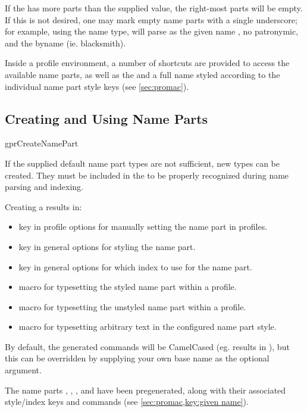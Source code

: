 \documentclass[
	a4paper,
]{article}
\begin{document}
If the  has more parts than the supplied value, the right-most parts will be empty. If this is not desired, one may mark empty name parts with a single underscore; for example, using the  name type,  will parse as the given name , no patronymic, and the byname  (ie. blacksmith).

Inside a profile environment, a number of shortcuts are provided to access the available name parts, as well as the  and a full name styled according to the individual name part style keys (see \cref{sec:promac}).

\subsection{Creating and Using Name Parts} %

\begin{docCommand}
	{gprCreateNamePart}
	{}

	If the supplied default name part types are not sufficient, new types can be created. They must be included in the  to be properly recognized during name parsing and indexing.

	Creating a  results in:
	\begin{itemize}
	\item {} key in profile options for manually setting the name part in profiles.
	\item {} key in general options for styling the name part.
	\item {} key in general options for which index to use for the name part.
	\item {} macro for typesetting the styled name part within a profile.
	\item {} macro for typesetting the unstyled name part within a profile.
	\item {} macro for typesetting arbitrary text in the configured name part style.
	\end{itemize}

	By default, the generated commands will be CamelCased (eg.  results in ), but this can be overridden by supplying your own base name as the optional argument.

	The name parts , , , and  have been pregenerated, along with their associated style/index keys and commands (see \cref{sec:promac,key:given name}).

\end{docCommand}
\end{document}
